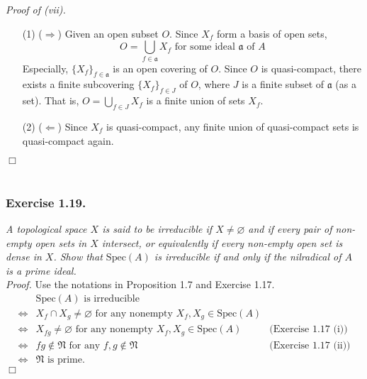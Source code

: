 \documentclass{article}
\begin{document}
\emph{Proof of (vii).}
\begin{enumerate}
\item[(1)]
($\Longrightarrow$)
Given an open subset $O$.
Since $X_f$ form a basis of open sets,
$$O = \bigcup_{f \in \mathfrak{a}} X_f \text{ for some ideal $\mathfrak{a}$ of $A$}$$
Especially, $\{X_f\}_{f \in \mathfrak{a}}$ is an open covering of $O$.
Since $O$ is quasi-compact, there exists a finite subcovering $\{X_f\}_{f \in J}$ of $O$,
where $J$ is a finite subset of $\mathfrak{a}$ (as a set).
That is,
$O = \bigcup_{f \in J} X_f$ is a finite union of sets $X_f$.
\item[(2)]
($\Longleftarrow$)
Since $X_f$ is quasi-compact, any finite union of quasi-compact sets is quasi-compact again.
\end{enumerate}
$\Box$ \\\\









\subsubsection*{Exercise 1.19.}
\emph{A topological space $X$ is said to be irreducible if
$X \neq \varnothing$ and if every pair of non-empty open sets in $X$ intersect, or
equivalently if every non-empty open set is dense in $X$.
Show that $\mathrm{Spec}(A)$ is irreducible if and only if
the nilradical of $A$ is a prime ideal.} \\

\emph{Proof.}
Use the notations in Proposition 1.7 and Exercise 1.17.
\begin{align*}
  &\text{$\mathrm{Spec}(A)$ is irreducible} \\
  \Longleftrightarrow&
  \text{$X_f \cap X_g \neq \varnothing$ for any nonempty $X_f, X_g \in \mathrm{Spec}(A)$} \\
  \Longleftrightarrow&
  \text{$X_{fg} \neq \varnothing$ for any nonempty $X_f, X_g \in \mathrm{Spec}(A)$}
    &\text{(Exercise 1.17 (i))} \\
  \Longleftrightarrow&
  \text{$fg \not\in \mathfrak{N}$ for any $f,g \not\in \mathfrak{N}$}
    &\text{(Exercise 1.17 (ii))} \\
  \Longleftrightarrow&
  \text{$\mathfrak{N}$ is prime.}
\end{align*}
$\Box$ \\\\
\end{document}
